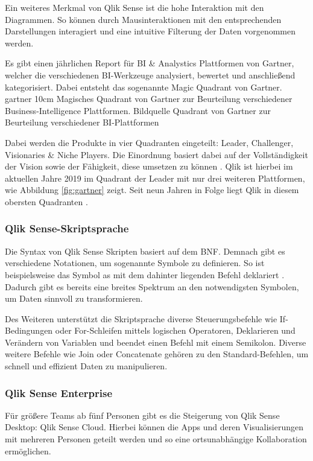 Ein weiteres Merkmal von Qlik Sense ist die hohe Interaktion mit den Diagrammen.
So können durch Mausinteraktionen mit den entsprechenden Darstellungen interagiert und eine intuitive Filterung der Daten vorgenommen werden.

Es gibt einen jährlichen Report für \gls{BI} \& Analystics Plattformen von Gartner, welcher die verschiedenen BI-Werkzeuge analysiert, bewertet und anschließend kategorisiert.
Dabei entsteht das sogenannte \glqq Magic Quadrant\grqq{} von Gartner.
\bild
{gartner}
{10cm}
{Magisches Quadrant von Gartner zur Beurteilung verschiedener Business-Intelligence Plattformen. Bildquelle }
{Quadrant von Gartner zur Beurteilung verschiedener BI-Plattformen}

Dabei werden die Produkte in vier Quadranten eingeteilt: Leader, Challenger, Visionaries \& Niche Players.
Die Einordnung basiert dabei auf der Vollständigkeit der Vision sowie der Fähigkeit, diese umsetzen zu können \cite{gartner}.
Qlik ist hierbei im aktuellen Jahre 2019 im Quadrant der \glqq Leader\grqq{} mit nur drei weiteren Plattformen, wie Abbildung \ref{fig:gartner} zeigt.
Seit neun Jahren in Folge liegt Qlik in diesem obersten Quadranten \cite{QlikTech.2019}.

\subsubsection{Qlik Sense-Skriptsprache}
Die Syntax von Qlik Sense Skripten basiert auf dem \gls{BNF}. 
Demnach gibt es verschiedene Notationen, um sogenannte \glqq Symbole\grqq{} zu definieren.
So ist beispielsweise das Symbol \glqq as\grqq{} mit dem dahinter liegenden Befehl  deklariert \cite{QlikTech.Februar2019}.
Dadurch gibt es bereits eine breites Spektrum an den notwendigsten Symbolen, um Daten sinnvoll zu transformieren.

Des Weiteren unterstützt die Skriptsprache diverse Steuerungsbefehle wie If-Bedingungen oder For-Schleifen mittels logischen Operatoren, Deklarieren und Verändern von Variablen und beendet einen Befehl mit einem Semikolon.
Diverse weitere Befehle wie \glqq Join\grqq{} oder \glqq Concatenate\grqq{} gehören zu den Standard-Befehlen, um schnell und effizient Daten zu manipulieren.

\subsubsection{Qlik Sense Enterprise}
\label{subsub:enterprise}
Für größere Teams ab fünf Personen gibt es die Steigerung von Qlik Sense Desktop: Qlik Sense Cloud. \cite{QlikTech.2019}
Hierbei können die Apps und deren Visualisierungen mit mehreren Personen geteilt werden und so eine ortsunabhängige Kollaboration ermöglichen.

